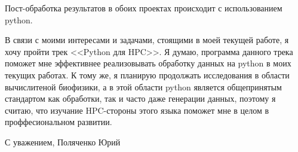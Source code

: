 \documentclass[12pt, a4paper]{awesome-cv}
\begin{document}
\begin{cvletter}
Пост-обработка результатов в обоих проектах происходит с использованием python.

В связи с моими интересами и задачами, стоящими в моей текущей работе, я хочу пройти трек <<Python для HPC>>. Я думаю, программа данного трека поможет мне эффективнее реализовывать обработку данных на python в моих текущих работах. К тому же, я планирую продолжать исследования в области вычислитеной биофизики, а в этой области python является общепринятым стандартом как обработки, так и часто даже генерации данных, поэтому я считаю, что изучание HPC-стороны этого языка поможет мне в целом в проффесиональном развитии.

\end{cvletter}

С уважением, Поляченко Юрий

\end{document}
